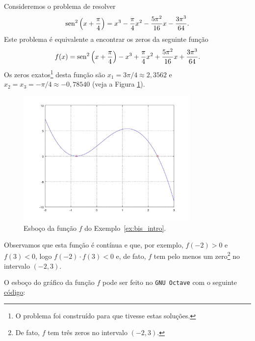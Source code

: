 \begin{ex}\label{ex:bis_intro}
  Consideremos o problema de resolver
  \begin{equation}
    \operatorname{sen}^2\left(x+\frac{\pi}{4}\right) = x^3 - \frac{\pi}{4}x^2 - \frac{5\pi^2}{16}x - \frac{3\pi^3}{64}.
  \end{equation}
Este problema é equivalente a encontrar os zeros da seguinte função
\begin{equation}
  f(x) = \operatorname{sen}^2\left(x+\frac{\pi}{4}\right) - x^3 + \frac{\pi}{4}x^2 + \frac{5\pi^2}{16}x + \frac{3\pi^3}{64}.
\end{equation}
Os zeros exatos\footnote{O problema foi construído para que tivesse estas soluções.} desta função são $x_1=3\pi/4\approx 2,3562$ e $x_2=x_3=-\pi/4\approx -0,78540$ (veja a Figura \ref{fig:bis_intro}).

\begin{figure}[h!]
  \centering
  \includegraphics[width=0.8\textwidth]{./cap_eq1d/dados/ex_bis_intro/fig_bis_intro}
  \caption{Esboço da função $f$ do Exemplo~\ref{ex:bis_intro}.}
  \label{fig:bis_intro}
\end{figure}

Observamos que esta função é contínua e que, por exemplo, $f(-2)>0$ e $f(3)<0$, logo $f(-2)\cdot f(3) < 0$ e, de fato, $f$ tem pelo menos um zero\footnote{De fato, $f$ tem três zeros no intervalo $(-2, 3)$.} no intervalo $(-2, 3)$.

\ifisoctave
O esboço do gráfico da função $f$ pode ser feito no \verb+GNU Octave+ com o seguinte \href{https://github.com/phkonzen/notas/blob/master/src/MatematicaNumerica/cap_eq1d/dados/ex_bis_intro/ex_bis_intro.m}{código}:

\fi
\end{ex}


